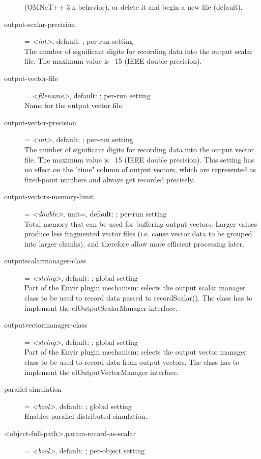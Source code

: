 \begin{description}
    (OMNeT++ 3.x behavior), or delete it and begin a new file (default).
\item[output-scalar-precision] = \textit{<int>}, default: ; per-run setting \\
    The number of significant digits for recording data into the output scalar
    file. The maximum value is ~15 (IEEE double precision).
\item[output-vector-file] = \textit{<filename>}, default: ; per-run setting \\
    Name for the output vector file.
\item[output-vector-precision] = \textit{<int>}, default: ; per-run setting \\
    The number of significant digits for recording data into the output vector
    file. The maximum value is ~15 (IEEE double precision). This setting has no
    effect on the "time" column of output vectors, which are represented as
    fixed-point numbers and always get recorded precisely.
\item[output-vectors-memory-limit] = \textit{<double>}, unit=, default: ; per-run setting \\
    Total memory that can be used for buffering output vectors. Larger values
    produce less fragmented vector files (i.e. cause vector data to be grouped
    into larger chunks), and therefore allow more efficient processing later.
\item[outputscalarmanager-class] = \textit{<string>}, default: ; global setting \\
    Part of the Envir plugin mechanism: selects the output scalar manager class
    to be used to record data passed to recordScalar(). The class has to
    implement the cIOutputScalarManager interface.
\item[outputvectormanager-class] = \textit{<string>}, default: ; global setting \\
    Part of the Envir plugin mechanism: selects the output vector manager class
    to be used to record data from output vectors. The class has to implement
    the cIOutputVectorManager interface.
\item[parallel-simulation] = \textit{<bool>}, default: ; global setting \\
    Enables parallel distributed simulation.
\item[<object-full-path>.param-record-as-scalar] = \textit{<bool>}, default: ; per-object setting \\

\end{description}
